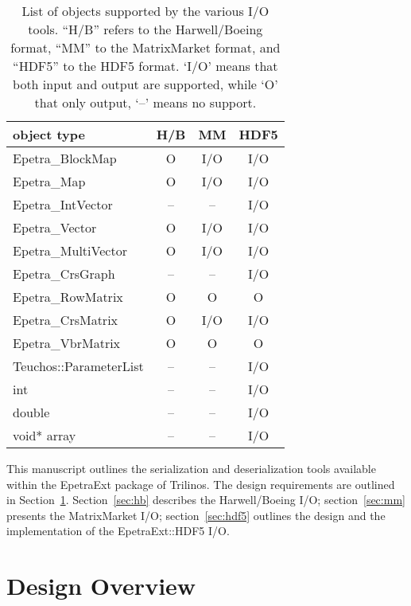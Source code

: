 \documentclass[11pt,relax]{SANDreport}
\begin{document}
\begin{table}
\begin{center}
\begin{tabular}{|l | c | c | c |}
\hline
object type           & H/B       & MM        & HDF5 \\
\hline
Epetra\_BlockMap      & O  & I/O & I/O \\
Epetra\_Map           & O  & I/O & I/O \\
Epetra\_IntVector     & -- & --  & I/O \\
Epetra\_Vector        & O  & I/O & I/O \\
Epetra\_MultiVector   & O  & I/O & I/O \\
Epetra\_CrsGraph      & -- & --  & I/O \\
Epetra\_RowMatrix     & O  &   O &   O \\
Epetra\_CrsMatrix     & O  & I/O & I/O \\
Epetra\_VbrMatrix     & O  &   O &   O \\
Teuchos::ParameterList& -- & --  & I/O \\
int                   & -- & --  & I/O \\
double                & -- & --  & I/O \\
void* array           & -- & --  & I/O \\
\hline
\end{tabular}
\caption{List of objects supported by the various I/O tools. ``H/B'' refers to
  the Harwell/Boeing format, ``MM'' to the MatrixMarket format, and ``HDF5''
    to the HDF5 format. `I/O' means that both input and output are supported,
       while `O' that only output, `--' means no support.}
\label{tab:supported}
\end{center}
\end{table}

\smallskip

This manuscript outlines the serialization and deserialization tools available
within the EpetraExt package of Trilinos. The design requirements are outlined
in Section~\ref{sec:design}.
Section~\ref{sec:hb} describes the
Harwell/Boeing I/O; section~\ref{sec:mm} presents the MatrixMarket I/O;
section~\ref{sec:hdf5} outlines the design and the implementation of the
EpetraExt::HDF5 I/O.

\section{Design Overview}
\label{sec:design}
\end{document}
